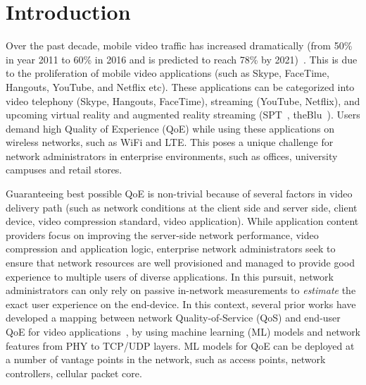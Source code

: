\section{Introduction}


Over the past decade, mobile video traffic has increased dramatically (from 50\% in year 2011 to 60\% in 2016 and is predicted to reach 78\% by 2021)~\cite{forecast2016cisco}. This is due to the proliferation of mobile video applications (such as Skype, FaceTime, Hangouts, YouTube, and Netflix etc). These applications can be categorized into video telephony (Skype, Hangouts, FaceTime), streaming (YouTube, Netflix), and upcoming virtual reality and augmented reality streaming (SPT~\cite{spt}, theBlu~\cite{theblu}). 
Users demand high Quality of Experience (QoE) while using these applications on wireless networks, such as WiFi and LTE. This poses a unique challenge for network administrators in enterprise environments, such as offices, university campuses and retail stores.

Guaranteeing best possible QoE is non-trivial because of several factors in video delivery path (such as network conditions at the client side and server side, client device, video compression standard, video application). While application content providers focus on improving the server-side network performance, video compression and application logic, enterprise network administrators seek to ensure that network resources are well provisioned and managed to provide good experience to multiple users of diverse applications. In this pursuit, network administrators can only rely on passive in-network measurements to {\em estimate} the exact user experience on the end-device. In this context, several prior works have developed a mapping between network Quality-of-Service (QoS) and end-user QoE for video applications~\cite{balachandran2013developing,aggarwal2014prometheus,fiedler2010generic}, by using machine learning (ML) models and network features from PHY to TCP/UDP layers. ML models for QoE can be deployed at a number of vantage points in the network, such as access points, network controllers, cellular packet core. 

